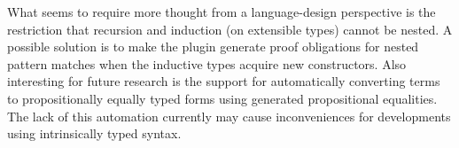 
What seems to require more thought from a language-design perspective is the
restriction that recursion and induction (on extensible types) cannot be nested.
A possible solution is to make the plugin generate proof obligations for
nested pattern matches when the inductive types acquire new constructors.
%
Also interesting for future research is the support for automatically converting
terms to propositionally equally typed forms using generated propositional equalities.
The lack of this automation currently may cause inconveniences for
developments using intrinsically typed syntax.

